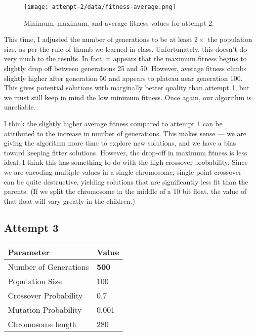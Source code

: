 \documentclass[12pt, letterpaper]{article}
\begin{document}
\begin{figure}[H]
    \centerline{\texttt{[image: attempt-2/data/fitness-average.png]}}
    \caption{Minimum, maximum, and average fitness values for attempt 2.}\label{Fig:Attempt2Fitness}
\end{figure}

This time, I adjusted the number of generations to be at least $2 \times$ the population size,
as per the rule of thumb we learned in class.
Unfortunately, this doesn't do very much to the results.
In fact, it appears that the maximum fitness begins to slightly drop off between generations 25 and 50.
However, average fitness climbs slightly higher after generation 50 and appears to plateau near generation 100.
This gives potential solutions with marginally better quality than attempt 1,
but we must still keep in mind the low minimum fitness.
Once again, our algorithm is unreliable.

I think the slightly higher average fitness compared to attempt 1 can be attributed to the increase in number of generations.
This makes sense --- we are giving the algorithm more time to explore new solutions,
and we have a bias toward keeping fitter solutions.
However, the drop-off in maximum fitness is less ideal.
I think this has something to do with the high crossover probability.
Since we are encoding multiple values in a single chromosome,
single point crossover can be quite destructive, yielding solutions that are significantly less fit than the parents.
(If we split the chromosome in the middle of a 10 bit float, the value of that float will vary greatly in the children.)

\subsection{Attempt 3}
\begin{center}
\begin{tabular}{p{} l}
    \toprule
    \textbf{Parameter}      & \textbf{Value}    \\ \midrule
    Number of Generations   & \textbf{500}      \\
    Population Size         & 100               \\
    Crossover Probability   & 0.7               \\
    Mutation Probability    & 0.001             \\ 
    Chromosome length       & 280               \\ \bottomrule
\end{tabular}
\end{center}
\end{document}

